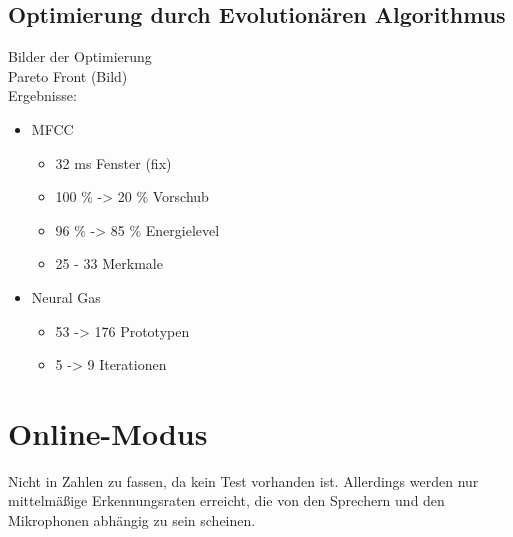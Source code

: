 \subsection{Optimierung durch Evolutionären Algorithmus}
Bilder der Optimierung\\
Pareto Front (Bild)\\
Ergebnisse:
\begin{itemize}
	\item MFCC
	\begin{itemize}
		\item 32 ms Fenster (fix)
		\item 100 \% -> 20 \% Vorschub
		\item 96 \% -> 85 \% Energielevel
		\item 25 - 33 Merkmale
	\end{itemize}
	\item Neural Gas
	\begin{itemize}
		\item 53 -> 176 Prototypen
		\item 5 -> 9 Iterationen
	\end{itemize}
\end{itemize}

\section{Online-Modus}
Nicht in Zahlen zu fassen, da kein Test vorhanden ist. Allerdings werden nur mittelmäßige Erkennungsraten erreicht, die von den Sprechern und den Mikrophonen abhängig zu sein scheinen.
